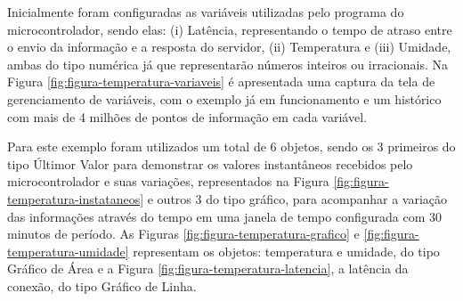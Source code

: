     	\begin{figure}[!h]
		
    	\end{figure}
    	
\newpage
    	
Inicialmente foram configuradas as variáveis utilizadas pelo programa do microcontrolador, sendo elas: (i) Latência, representando o tempo de atraso entre o envio da informação e a resposta do servidor, (ii) Temperatura e (iii) Umidade, ambas do tipo numérica já que representarão números inteiros ou irracionais. Na Figura \ref{fig:figura-temperatura-variaveis} é apresentada uma captura da tela de gerenciamento de variáveis, com o exemplo já em funcionamento e um histórico com mais de 4 milhões de pontos de informação em cada variável.

        \begin{figure}[!h]
    	\end{figure}
    	
Para este exemplo foram utilizados um total de 6 objetos, sendo os 3 primeiros do tipo Últimor Valor para demonstrar os valores instantâneos recebidos pelo microcontrolador e suas variações, representados na Figura \ref{fig:figura-temperatura-instataneos} e outros 3 do tipo gráfico, para acompanhar a variação das informações através do tempo em uma janela de tempo configurada com 30 minutos de período. As Figuras \ref{fig:figura-temperatura-grafico} e  \ref{fig:figura-temperatura-umidade} representam os objetos: temperatura e umidade, do tipo Gráfico de Área e a Figura \ref{fig:figura-temperatura-latencia}, a latência da conexão, do tipo Gráfico de Linha.

